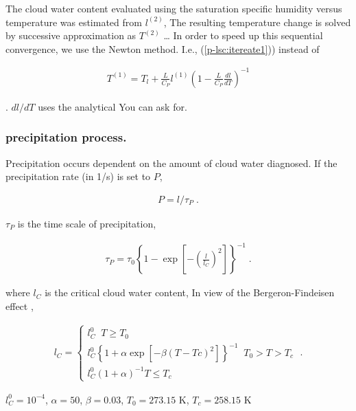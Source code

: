 The cloud water content evaluated using the saturation specific humidity
versus temperature was estimated from \(l^{(2)}\), The resulting
temperature change is solved by successive approximation as \(T^{(2)}\)
\ldots{} In order to speed up this sequential convergence, we use the
Newton method. I.e.,
(\protect\hyperlink{p-lsc:itereateux5cux25201}{{[}p-lsc:itereate1{]}}))
instead of

\begin{eqnarray}
  T^{(1)} = T_l +  \frac{L}{C_P} l^{(1)}
                   \left( 1 - \frac{L}{C_P} \frac{dl}{dT} \right)^{-1}
\end{eqnarray}

. \(dl/dT\) uses the analytical You can ask for.

\hypertarget{precipitation-process.}{%
\subsubsection{precipitation process.}\label{precipitation-process.}}

Precipitation occurs dependent on the amount of cloud water diagnosed.
If the precipitation rate (in 1/s) is set to \(P\),

\begin{eqnarray}
  P = l / \tau_P \; .
\end{eqnarray}

\(\tau_P\) is the time scale of precipitation,

\begin{eqnarray}
  \tau_P  = \tau_0 \left\{ 1 - \exp\left[ - \left(\frac{l}{l_C}\right)^2  
                                   \right]  \right\}^{-1} \; .
\end{eqnarray}

where \(l_C\) is the critical cloud water content, In view of the
Bergeron-Findeisen effect ,

\begin{eqnarray}
  l_C = \left\{
        \begin{array}{ll}
          l_C^0 \; \;  T \ge T_0 \\
          l_C^0 \left\{ 1+\alpha \exp\left[ - \beta(T-Tc)^2 \right]
                \right\}^{-1}\; \;
                       T_0 > T >  T_c \\
          l_C^0 ( 1+\alpha )^{-1}
                       T \le T_c
        \end{array}
        \right. \; .
\end{eqnarray}

\(l_C^0=10^{-4}\), \(\alpha=50\), \(\beta=0.03\), \(T_0=273.15\) K,
\(T_c=258.15\) K

